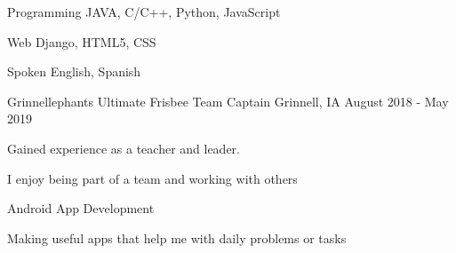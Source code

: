 \documentclass[11pt, a4paper]{awesome-cv}
\begin{document}
\begin{cvskills}
  \cvskill
    {Programming} 
    {JAVA, C/C++, Python, JavaScript} 

  \cvskill
    {Web} 
    {Django, HTML5, CSS} 


  \cvskill
    {Spoken} 
    {English, Spanish} 

\end{cvskills}


\begin{cventries}

  \cventry
    {Grinnellephants Ultimate Frisbee}
    {Team Captain}
    {Grinnell, IA}
    {August 2018 - May 2019}
    {
      \begin{cvitems}
        \item {Gained experience as a teacher and leader.}
        \item {I enjoy being part of a team and working with others}
      \end{cvitems}
    }

    \cventry
      {}
      {Android App Development}
      {}
      {}
      {
        \begin{cvitems}
          \item {Making useful apps that help me with daily problems or tasks}
        \end{cvitems}
      }

\end{cventries}
\end{document}
